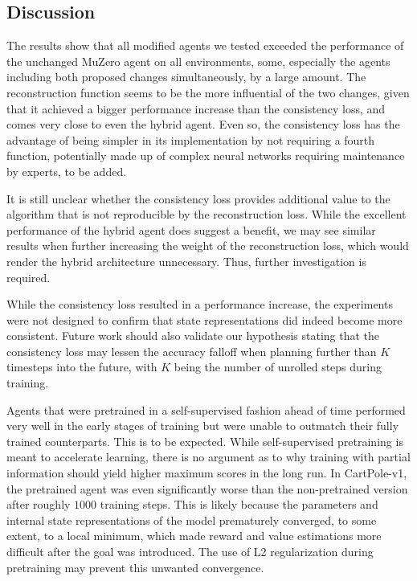 \subsection{Discussion}
The results show that all modified agents we tested exceeded the performance of the unchanged MuZero agent on all environments, some, especially the agents including both proposed changes simultaneously, by a large amount. The reconstruction function seems to be the more influential of the two changes, given that it achieved a bigger performance increase than the consistency loss, and comes very close to even the hybrid agent. Even so, the consistency loss has the advantage of being simpler in its implementation by not requiring a fourth function, potentially made up of complex neural networks requiring maintenance by experts, to be added.

It is still unclear whether the consistency loss provides additional value to the algorithm that is not reproducible by the reconstruction loss. While the excellent performance of the hybrid agent does suggest a benefit, we may see similar results when further increasing the weight of the reconstruction loss, which would render the hybrid architecture unnecessary. Thus, further investigation is required.

While the consistency loss resulted in a performance increase, the experiments were not designed to confirm that state representations did indeed become more consistent. Future work should also validate our hypothesis stating that the consistency loss may lessen the accuracy falloff when planning further than $K$ timesteps into the future, with $K$ being the number of unrolled steps during training.

Agents that were pretrained in a self-supervised fashion ahead of time performed very well in the early stages of training but were unable to outmatch their fully trained counterparts. This is to be expected. While self-supervised pretraining is meant to accelerate learning, there is no argument as to why training with partial information should yield higher maximum scores in the long run. In CartPole-v1, the pretrained agent was even significantly worse than the non-pretrained version after roughly $1000$ training steps. This is likely because the parameters and internal state representations of the model prematurely converged, to some extent, to a local minimum, which made reward and value estimations more difficult after the goal was introduced. The use of L2 regularization during pretraining may prevent this unwanted convergence.